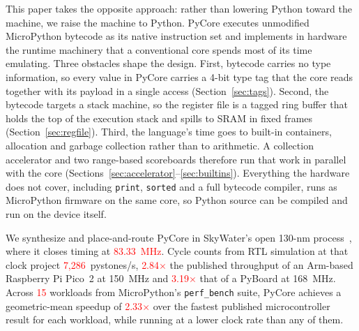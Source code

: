 This paper takes the opposite approach: rather than lowering Python
toward the machine, we raise the machine to Python. \textmu{}PyCore
executes unmodified MicroPython bytecode as its native instruction set
and implements in hardware the runtime machinery that a conventional
core spends most of its time emulating. Three obstacles shape the
design.
First, bytecode carries no type information, so every value in
\textmu{}PyCore carries a 4-bit type tag that the core reads together
with its payload in a single access (Section~\ref{sec:tags}).
Second, the bytecode targets a stack machine, so the register file is a
tagged ring buffer that holds the top of the execution stack and
spills to SRAM in fixed frames (Section~\ref{sec:regfile}).
Third, the language's time goes to built-in containers, allocation and
garbage collection rather than to arithmetic. A collection accelerator
and two range-based scoreboards therefore run that work in parallel with
the core (Sections~\ref{sec:accelerator}--\ref{sec:builtins}).
Everything the hardware does not cover, including \texttt{print},
\texttt{sorted} and a full bytecode compiler, runs as MicroPython
firmware on the same core, so Python source can be compiled and run on
the device itself.

We synthesize and place-and-route \textmu{}PyCore in SkyWater's open
130-nm process~\cite{skywater130}, where it closes timing at
\textcolor{red}{83.33~MHz}. Cycle counts from RTL simulation at that
clock project \textcolor{red}{7,286}~pystones/s,
\textcolor{red}{2.84$\times$} the published throughput of an Arm-based
Raspberry Pi Pico~2 at 150~MHz and \textcolor{red}{3.19$\times$} that of a
PyBoard at 168~MHz. Across \textcolor{red}{15} workloads from
MicroPython's \texttt{perf\_bench} suite, \textmu{}PyCore achieves a
geometric-mean speedup of \textcolor{red}{2.33$\times$} over the fastest
published microcontroller result for each workload, while running at a
lower clock rate than any of them.

